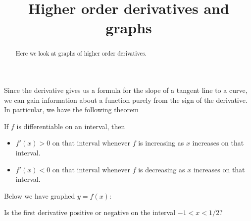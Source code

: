 \documentclass{ximera}
\title[Dig-In:]{Higher order derivatives and graphs}
\begin{document}
\begin{abstract}
 Here we look at graphs of higher order derivatives.   
\end{abstract}
\maketitle

Since the derivative gives us a formula for the slope of a tangent
line to a curve, we can gain information about a function purely from
the sign of the derivative.  In particular, we have the following theorem
\begin{theorem}
  If $f$ is differentiable on an interval, then
\begin{itemize}
\item $f'(x)>0$ on that interval whenever $f$ is increasing as $x$
  increases on that interval.
\item $f'(x)<0$ on that interval whenever $f$ is decreasing as $x$
  increases on that interval.
\end{itemize}
\end{theorem}
\begin{question}
  Below we have graphed $y=f(x)$:
  \begin{image}
  \end{image}
  Is the first derivative positive or negative on the interval $-1<x<1/2$?
  \begin{prompt}
    \begin{multipleChoice}
    \end{multipleChoice}
  \end{prompt}
\end{question}
\end{document}
